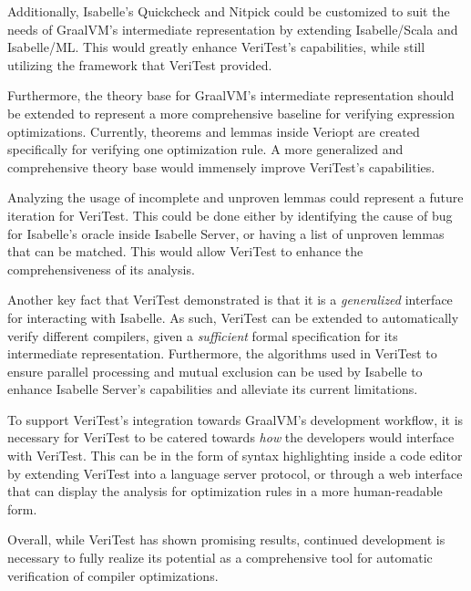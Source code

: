 Additionally, Isabelle's Quickcheck and Nitpick could be customized to suit the needs of GraalVM's intermediate representation by extending 
Isabelle/Scala and Isabelle/ML. This would greatly enhance VeriTest's capabilities, while still utilizing the framework that VeriTest provided.

Furthermore, the theory base for GraalVM's intermediate representation should be extended to represent a more 
comprehensive baseline for verifying expression optimizations. Currently, theorems and lemmas inside Veriopt are created specifically for verifying 
one optimization rule. A more generalized and comprehensive theory base would immensely improve VeriTest's capabilities.

Analyzing the usage of incomplete and unproven lemmas could represent a future iteration for VeriTest. 
This could be done either by identifying the cause of bug for Isabelle's oracle inside Isabelle Server, or having 
a list of unproven lemmas that can be matched. This would allow VeriTest to enhance the comprehensiveness of its analysis.

Another key fact that VeriTest demonstrated is that it is a \emph{generalized} interface for interacting with Isabelle. As such, VeriTest 
can be extended to automatically verify different compilers, given a \emph{sufficient} formal specification for its intermediate representation.
Furthermore, the algorithms used in VeriTest to ensure parallel processing and mutual exclusion can be used by Isabelle to enhance Isabelle Server's 
capabilities and alleviate its current limitations.

To support VeriTest's integration towards GraalVM's development workflow, it is necessary for VeriTest to be catered towards 
\emph{how} the developers would interface with VeriTest. This can be in the form of syntax highlighting inside a code editor by extending 
VeriTest into a language server protocol, or through a web interface that can display the analysis for optimization rules in a more 
human-readable form.

Overall, while VeriTest has shown promising results, continued development is necessary to fully realize its potential as a 
comprehensive tool for automatic verification of compiler optimizations.